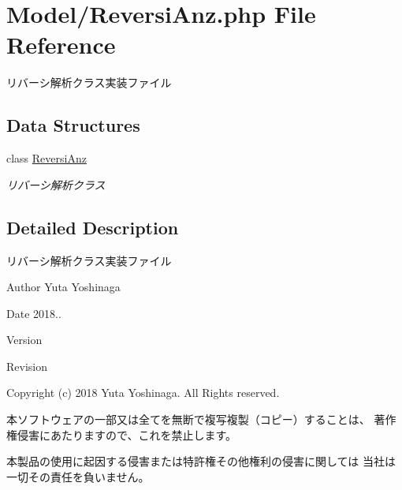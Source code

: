 \hypertarget{_reversi_anz_8php}{}\section{Model/\+Reversi\+Anz.php File Reference}
\label{_reversi_anz_8php}


リバーシ解析クラス実装ファイル  


\subsection*{Data Structures}
\begin{DoxyCompactItemize}
\item 
class \hyperlink{class_reversi_anz}{Reversi\+Anz}
\begin{DoxyCompactList}\small\item\em リバーシ解析クラス \end{DoxyCompactList}\end{DoxyCompactItemize}


\subsection{Detailed Description}
リバーシ解析クラス実装ファイル 

\begin{DoxyAuthor}{Author}
Yuta Yoshinaga 
\end{DoxyAuthor}
\begin{DoxyDate}{Date}
2018.. 
\end{DoxyDate}
\begin{DoxyParagraph}{Version}

\end{DoxyParagraph}
\begin{DoxyParagraph}{Revision}

\end{DoxyParagraph}


Copyright (c) 2018 Yuta Yoshinaga. All Rights reserved.


\begin{DoxyItemize}
\item 本ソフトウェアの一部又は全てを無断で複写複製（コピー）することは、 著作権侵害にあたりますので、これを禁止します。
\item 本製品の使用に起因する侵害または特許権その他権利の侵害に関しては 当社は一切その責任を負いません。 
\end{DoxyItemize}